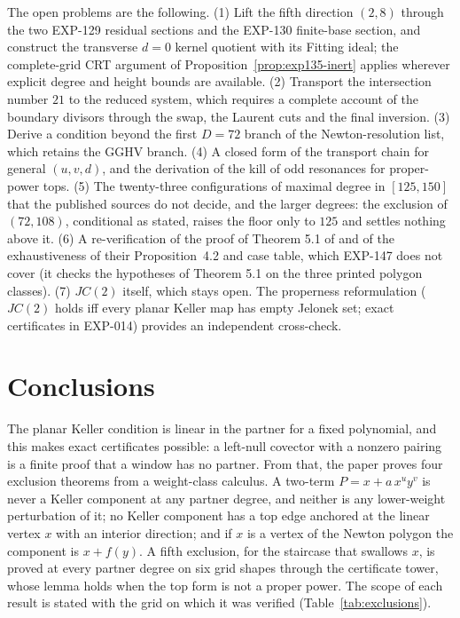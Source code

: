 \documentclass[11pt]{article}
\theoremstyle{remark}
\begin{document}
The open problems are the following. (1) Lift the fifth direction $(2,8)$ through the two EXP-129 residual sections and the EXP-130 finite-base section, and construct the transverse
$d=0$ kernel quotient with its Fitting ideal; the complete-grid CRT argument of Proposition~\ref{prop:exp135-inert} applies wherever explicit degree and height bounds are available. (2) Transport the intersection number $21$ to the
reduced system, which requires a complete account of the boundary divisors through the swap, the Laurent cuts and the final inversion. (3) Derive a condition beyond the first $D=72$ branch of the Newton-resolution list, which retains the
GGHV branch. (4) A closed form of the transport chain for general $(u,v,d)$, and the derivation of the kill of odd resonances for proper-power tops. (5) The twenty-three configurations of maximal degree in $[125,150]$ that the
published sources do not decide, and the larger degrees: the exclusion of $(72,108)$, conditional as stated, raises the floor only to $125$ and settles nothing above it. (6) A re-verification of the proof of Theorem 5.1 of \cite{GGHV2022} and of the exhaustiveness of their Proposition~4.2 and case table, which EXP-147 does not cover (it checks the hypotheses of Theorem 5.1 on the three printed polygon classes). (7) $JC(2)$ itself, which stays open.
The properness reformulation ($JC(2)$ holds iff every planar Keller map has empty Jelonek set; exact certificates in EXP-014) provides an independent cross-check.

\section{Conclusions}\label{sec:conclusions}

The planar Keller condition is linear in the partner for a fixed polynomial, and this makes exact certificates possible: a left-null covector with a nonzero pairing is a finite proof that a window has no
partner. From that, the paper proves four exclusion theorems from a weight-class calculus. A two-term $P=x+a\,x^uy^v$ is never a Keller component at any partner degree, and neither is any
lower-weight perturbation of it; no Keller component has a top edge anchored at the linear vertex $x$ with an interior direction; and if $x$ is a vertex of the Newton polygon the component is $x+f(y)$. A fifth
exclusion, for the staircase that swallows $x$, is proved at every partner degree on six grid shapes through the certificate tower, whose lemma holds when the top form is not a proper power. The scope of each result is stated
with the grid on which it was verified (Table~\ref{tab:exclusions}).
\end{document}
